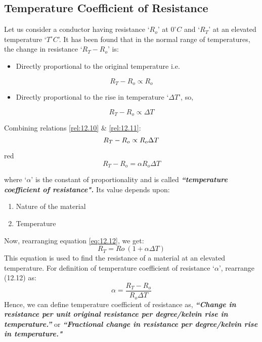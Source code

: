 \subsection{Temperature Coefficient of Resistance}
Let us consider a conductor having resistance ‘$R_{o}$’ at $0^{\circ} C$ and `$R_{T}$' at an elevated temperature `$T^{\circ}C$'. It has been found that in the normal range of temperatures, the change in resistance ‘$R_{T} - R_{o}$’ is:
\begin{itemize}
\item Directly proportional to the original temperature i.e. 
\end{itemize}
  \begin{equation}\label{rel:12.10}
    R_{T} - R_{o} \propto R_{o}
  \end{equation}
  \begin{itemize}
\item Directly proportional to the rise in temperature `$\Delta T$’, so,
  \end{itemize}
\begin{equation}\label{rel:12.11}
    R_{T} - R_{o} \propto\Delta T
\end{equation}

Combining relations \ref{rel:12.10} \& \ref{rel:12.11}:
\begin{equation}\notag
    R_{T} - R_{o}\propto R_{o}\Delta T
\end{equation}
\begin{mybox}{red}{}
    \begin{equation}\label{eq:12.12}
        R_{T} - R_{o} = \alpha R_{o}\Delta T
    \end{equation}
\end{mybox}
\noindent where ‘$\alpha$’ is the constant of proportionality and
is called \textit{\textbf{``temperature coefficient of resistance".}} Its
value depends upon:
\begin{enumerate}[label=(\roman*)] 
\item Nature of the material
\item Temperature 
\end{enumerate}
Now, rearranging equation \ref{eq:12.12}, we get:
\begin{equation}\nonumber
    R_{T} = R{o}\:(1 + \alpha\Delta T)
\end{equation}
This equation is used to find the resistance of a material at
an elevated temperature.
For definition of temperature coefficient of resistance `$\alpha$',
rearrange (12.12) as:
\begin{equation}\label{eq:12.13}
    \alpha = \frac{R_{T}-R_{o}}{R_{o}\Delta T} 
\end{equation}
Hence, we can define temperature coefficient of resistance as,
\textit{\textbf{``Change in resistance per unit original resistance per degree/kelvin rise in temperature.”}} or \textit{\textbf{``Fractional change in resistance per degree/kelvin rise in temperature."}}

